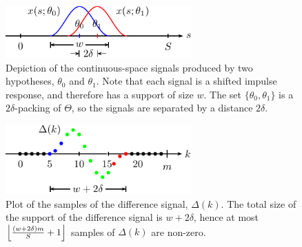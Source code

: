 \documentclass[conference]{IEEEtran}
\DeclarePairedDelimiter\floor{\lfloor}{\rfloor}
\begin{document}
\begin{figure}[t]
	\centering
	\includegraphics[width=2.8in]{overlap-middle-pics}
	\caption{Depiction of the continuous-space signals produced by two
		hypotheses, $\theta_0$ and $\theta_1$. Note that each signal is a
		shifted impulse response, and therefore has a support of size $w$.
		The set $\{\theta_0, \theta_1\}$ is a $2\delta$-packing of
		$\Theta$, so the signals are separated by a distance $2\delta$.}
	\label{fig:overlap-middle}
\end{figure}

\begin{figure}[t]
	\centering
	\includegraphics[width=2.8in]{delta-sampled-pics}
	\caption{Plot of the samples of the difference signal, $\Delta(k)$. The
		total size of the support of the difference signal is $w+2\delta$,
		hence at most $\floor*{\frac{(w + 2\delta)m}{S} + 1}$ samples of
		$\Delta(k)$ are non-zero.}
	\label{fig:delta-sampled}
\end{figure}
\end{document}
